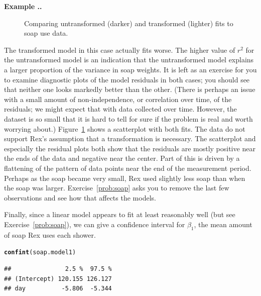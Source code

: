 \documentclass[twoside]{book}\usepackage[]{graphicx}\usepackage[]{xcolor}
\makeatletter
\newcommand{\hlstd}[1]{\textcolor[rgb]{0.345,0.345,0.345}{#1}}%
\newcommand{\hlkwd}[1]{\textcolor[rgb]{0.737,0.353,0.396}{\textbf{#1}}}%
\newenvironment{kframe}{%
 \def\at@end@of@kframe{}%
 \ifinner\ifhmode%
  \def\at@end@of@kframe{\end{minipage}}%
  \begin{minipage}{\columnwidth}%
 \fi\fi%
 \def\FrameCommand##1{\hskip\@totalleftmargin \hskip-\fboxsep
 \colorbox{shadecolor}{##1}\hskip-\fboxsep
     \hskip-\linewidth \hskip-\@totalleftmargin \hskip\columnwidth}%
 \MakeFramed {\advance\hsize-\width
   \@totalleftmargin\z@ \linewidth\hsize
   \@setminipage}}%
 {\par\unskip\endMakeFramed%
 \at@end@of@kframe}
\newenvironment{knitrout}{}{} %
\newcommand{\Rindex}[1]{\index{\texttt{#1}}}
\newcounter{example}[section]
\newenvironment{example}%
{\refstepcounter{example}%
\textbf{Example \thesection.\arabic{example}. }}%
{}
\makeatother
\begin{document}
\begin{example}
\begin{figure}
\caption{Comparing untransformed (darker) and transformed 
(lighter) fits to soap use data.}
\label{fig:soap}%
\end{figure}
%
The transformed model in this case actually fits worse.
The higher value of $r^2$ for the untransformed model is an indication 
that the untransformed model explains a larger proportion of the variance in soap weights.  It is left as an exercise for you to examine diagnostic plots of the model residuals in both cases; you should see that neither one looks markedly better than the other. (There is perhaps an issue with a small amount of non-independence, or correlation over time, of the residuals; we might expect that with data collected over time.  However, the dataset is so small that it is hard to tell for sure if the problem is real and worth worrying about.)  
Figure~\ref{fig:soap} shows a scatterplot
with both fits.  
The data do not support Rex's assumption that a transformation
is necessary.  
The scatterplot and especially the residual plots both show that the 
residuals are mostly positive near the ends of the data and negative
near the center.  Part of this is driven by a flattening of the pattern
of data points near the end of the measurement period.  Perhaps as the soap
became very small, Rex used slightly less soap than when the soap was
larger.
Exercise~\ref{prob:soap} asks you to remove the last few observations
and see how that affects the models.

Finally, since a linear model appears to fit at least reasonably well
(but see Exercise~\ref{prob:soap}), 
we can give a confidence interval for $\beta_1$, 
the mean amount of soap Rex uses each shower.
%
%
\Rindex{confint()}%
\begin{knitrout}
\color{fgcolor}\begin{kframe}
\begin{alltt}
\hlkwd{confint}\hlstd{(soap.model1)}
\end{alltt}
\begin{verbatim}
##               2.5 %  97.5 %
## (Intercept) 120.155 126.127
## day          -5.806  -5.344
\end{verbatim}
\end{kframe}
\end{knitrout}
\end{example}
\end{document}
